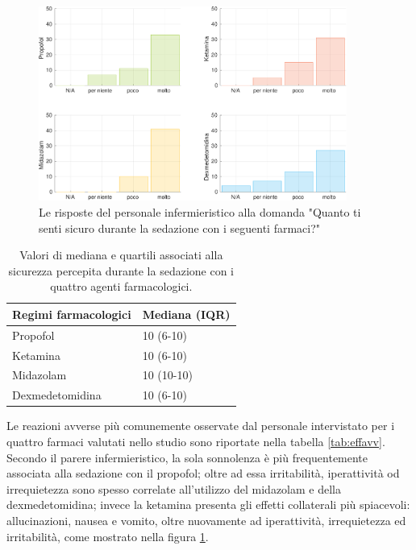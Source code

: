 \begin{figure}[!h]
    \centering
    \includegraphics[width=0.9\textwidth]{Figure/sicurezza.pdf}
    \caption{Le risposte del personale infermieristico alla domanda "Quanto ti senti sicuro durante la sedazione con i seguenti farmaci?"}
    \label{fig:sicurezza}
\end{figure}

\bgroup
\def\arraystretch{1.5}
\begin{table}[h]
    \centering
    \begin{tabular}{|l|l|}
         Regimi farmacologici & Mediana (IQR) \\ \hline
       Propofol & 10 (6-10)  \\
       Ketamina & 10 (6-10) \\
       Midazolam & 10 (10-10) \\
       Dexmedetomidina & 10 (6-10) 
    \end{tabular}
    \caption{Valori di mediana e quartili associati alla sicurezza percepita durante la sedazione con i quattro agenti farmacologici.}
    \label{tab:sicurezzased}
\end{table}
\egroup

Le reazioni avverse più comunemente osservate dal personale intervistato per i quattro farmaci valutati nello studio sono riportate nella tabella \ref{tab:effavv}. Secondo il parere infermieristico, la sola sonnolenza è più frequentemente associata alla sedazione con il propofol; oltre ad essa irritabilità, iperattività od irrequietezza sono spesso correlate all'utilizzo del midazolam e della dexmedetomidina; invece la ketamina presenta gli effetti collaterali più spiacevoli: allucinazioni, nausea e vomito, oltre nuovamente ad iperattività, irrequietezza ed irritabilità, come mostrato nella figura \ref{fig:sicurezza}.

